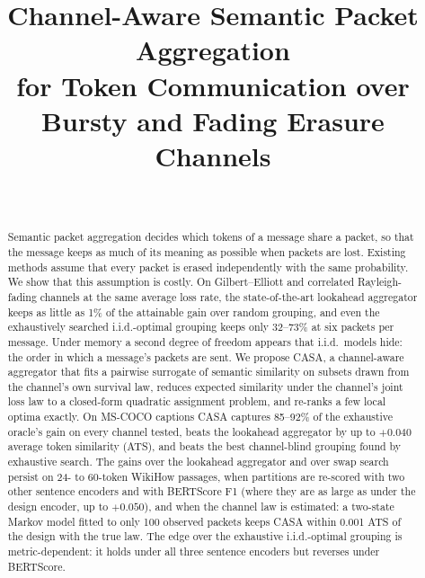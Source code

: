 \documentclass[journal,onecolumn,11pt,draftclsnofoot]{IEEEtran}
\begin{document}
\title{Channel-Aware Semantic Packet Aggregation\\for Token Communication over Bursty and Fading Erasure Channels}

\author{\\
}

\maketitle

\begin{abstract}
Semantic packet aggregation decides which tokens of a message share a packet, so that the message keeps as much of its meaning as possible when packets are lost. Existing methods assume that every packet is erased independently with the same probability. We show that this assumption is costly. On Gilbert--Elliott and correlated Rayleigh-fading channels at the same average loss rate, the state-of-the-art lookahead aggregator keeps as little as 1\% of the attainable gain over random grouping, and even the exhaustively searched i.i.d.-optimal grouping keeps only 32--73\% at six packets per message. Under memory a second degree of freedom appears that i.i.d.\ models hide: the order in which a message's packets are sent. We propose CASA, a channel-aware aggregator that fits a pairwise surrogate of semantic similarity on subsets drawn from the channel's own survival law, reduces expected similarity under the channel's joint loss law to a closed-form quadratic assignment problem, and re-ranks a few local optima exactly. On MS-COCO captions CASA captures 85--92\% of the exhaustive oracle's gain on every channel tested, beats the lookahead aggregator by up to $+0.040$ average token similarity (ATS), and beats the best channel-blind grouping found by exhaustive search. The gains over the lookahead aggregator and over swap search persist on 24- to 60-token WikiHow passages, when partitions are re-scored with two other sentence encoders and with BERTScore F1 (where they are as large as under the design encoder, up to $+0.050$), and when the channel law is estimated: a two-state Markov model fitted to only 100 observed packets keeps CASA within 0.001 ATS of the design with the true law. The edge over the exhaustive i.i.d.-optimal grouping is metric-dependent: it holds under all three sentence encoders but reverses under BERTScore.
\end{abstract}
\end{document}
